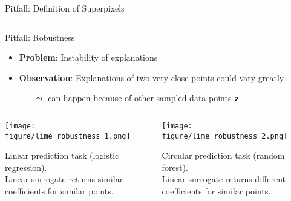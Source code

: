 \documentclass[11pt,compress,t,notes=noshow, aspectratio=169, xcolor=table]{beamer}
\begin{document}
\begin{frame}{Pitfall: Definition of Superpixels }
\begin{columns}
\begin{column}{0.6\textwidth}
	    \end{column}
	\end{columns}
\end{frame}

\begin{frame}[c]{Pitfall: Robustness }
\begin{itemize}
	\item \textbf{Problem}: Instability of explanations 
	\item \textbf{Observation}: Explanations of two very close points could vary greatly 
	\begin{itemize}
	    \item[$\leadsto$] can happen because of other sampled data points $\mathbf{z}$
	\end{itemize}
\end{itemize}
\vspace{-0.7cm}
\begin{columns}[totalwidth=\textwidth]
	\begin{column}{0.48\textwidth}
		\begin{center}
		
		\texttt{[image: figure/lime\_robustness\_1.png]}
		
		{Linear prediction task (logistic regression). \\Linear surrogate returns similar coefficients for similar points.}
		
		\end{center}
	\end{column}
	\begin{column}{0.48\textwidth}
		\begin{center}
	\texttt{[image: figure/lime\_robustness\_2.png]}
	
	{Circular prediction task (random forest). \\Linear surrogate returns different coefficients for similar points.}
	
	\end{center}
\end{column}
\end{columns}
\end{frame}


\end{document}
\end{itemize}
\end{column}
\end{columns}
\end{frame}
\end{document}
